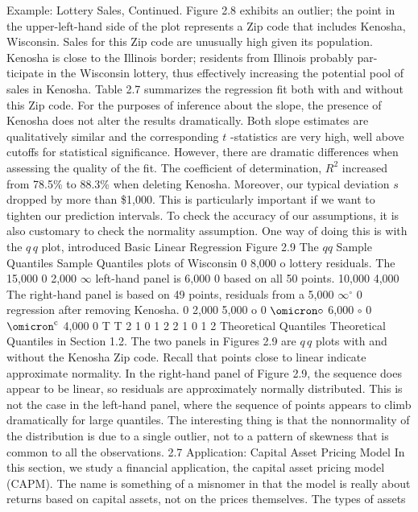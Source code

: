\documentclass[11pt]{article}
\begin{document}
Example: Lottery Sales, Continued. Figure 2.8 exhibits an outlier; the point in
 the upper-left-hand side of the plot represents a \(\mathrm{Z i p}\) code that includes Kenosha,
Wisconsin. Sales for this Zip code are unusually high given its population.
Kenosha is close to the Illinois border; residents from Illinois probably par-
ticipate in the Wisconsin lottery, thus effectively increasing the potential pool of
 sales in Kenosha. Table 2.7 summarizes the regression fit both with and without
this Zip code.
For the purposes of inference about the slope, the presence of Kenosha does
not alter the results dramatically. Both slope estimates are qualitatively similar
 and the corresponding \(t\) -statistics are very high, well above cutoffs for statistical
 significance. However, there are dramatic differences when assessing the quality
 of the fit. The coefficient of determination, \(R^{2}\) increased from 78.5\% to 88.3\%
when deleting Kenosha. Moreover, our typical deviation \(s\) dropped by more
than \$1,000. This is particularly important if we want to tighten our prediction
intervals.
To check the accuracy of our assumptions, it is also customary to check the
normality assumption. One way of doing this is with the \(q \, q\) plot, introduced
 Basic Linear Regression
Figure 2.9 The \(q q\) Sample Quantiles Sample Quantiles
plots of Wisconsin 0 8,000 o
lottery residuals. The 15,000 0 2,000 \(\infty\)
left-hand panel is 6,000 0
 based on all 50 points. 10,000 4,000
The right-hand panel
 is based on 49 points,
residuals from a 5,000 \(\infty^{\circ}\) 0
regression after
removing Kenosha. 0 2,000
5,000 o 0 \(\omicron\circ\) 6,000 \(\circ\) 0 \(\omicron^{\mathrm{c}}\)
4,000
0
T T
2 1 0 1 2 2 1 0 1 2
Theoretical Quantiles Theoretical Quantiles
in Section 1.2. The two panels in Figures 2.9 are \(q \, q\) plots with and without
 the Kenosha Zip code. Recall that points close to linear indicate approximate
normality. In the right-hand panel of Figure 2.9, the sequence does appear to be
 linear, so residuals are approximately normally distributed. This is not the case in
 the left-hand panel, where the sequence of points appears to climb dramatically for
large quantiles. The interesting thing is that the nonnormality of the distribution
 is due to a single outlier, not to a pattern of skewness that is common to all the
observations.
2.7 Application: Capital Asset Pricing Model
In this section, we study a financial application, the capital asset pricing model
(CAPM). The name is something of a misnomer in that the model is really about
returns based on capital assets, not on the prices themselves. The types of assets
\end{document}
